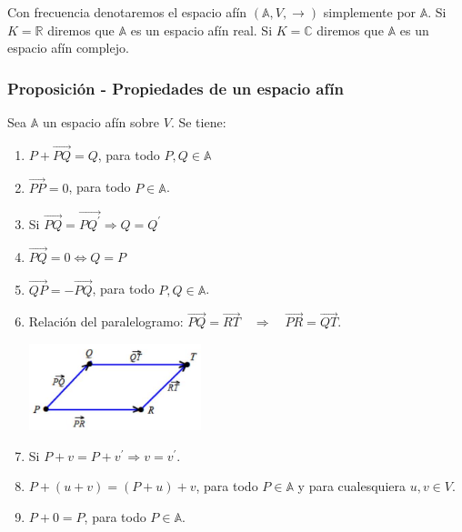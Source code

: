 \documentclass[12pt, a4paper, ones, notitlepage, openany,titlepage]{article}
\begin{document}
Con frecuencia denotaremos el espacio afín $(\mathbb{A}, V, \rightarrow)$ simplemente por $\mathbb{A}$. Si $K=\mathbb{R}$ diremos que $\mathbb{A}$ es un espacio afín real. Si $K=\mathbb{C}$ diremos que $\mathbb{A}$ es un espacio afín complejo.

\subsubsection{Proposición - Propiedades de un espacio afín}
\noindent Sea $\mathbb{A}$ un espacio afín sobre $V$. Se tiene:
\begin{enumerate}[label=(\arabic*)]
\item $P+\overrightarrow{P Q}=Q$, para todo $P, Q \in \mathbb{A}$

\item $\overrightarrow{P P}=0$, para todo $P \in \mathbb{A}$.

\item Si $\overrightarrow{P Q}=\overrightarrow{P Q^{\prime}} \Longrightarrow Q=Q^{\prime}$

\item $\overrightarrow{P Q}=0 \Longleftrightarrow Q=P$

\item $\overrightarrow{Q P}=-\overrightarrow{P Q}$, para todo $P, Q \in \mathbb{A}$.

\item Relación del paralelogramo: $\overrightarrow{P Q}=\overrightarrow{R T} \quad \Longrightarrow \quad \overrightarrow{P R}=\overrightarrow{Q T}$.

\begin{center}
\includegraphics[max width=5cm]{2023_03_01_7659aec5e35f9a9b2d3cg-02}
\end{center}

\item Si $P+v=P+v^{\prime} \Rightarrow v=v^{\prime}$.

\item $P+(u+v)=(P+u)+v$, para todo $P \in \mathbb{A}$ y para cualesquiera $u, v \in V$.

\item $P+0=P$, para todo $P \in \mathbb{A}$.

\end{enumerate}
\end{document}
